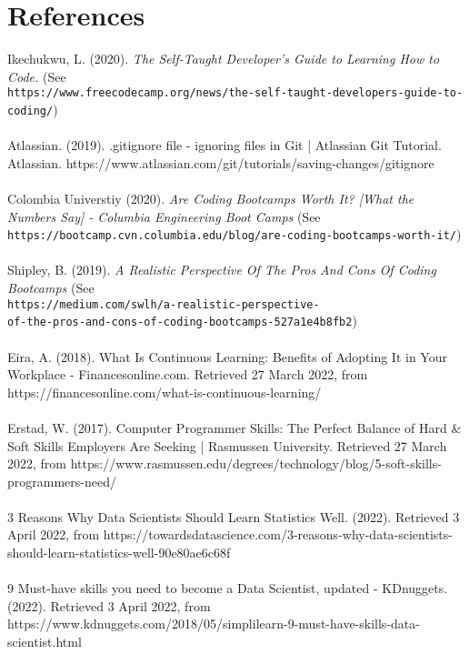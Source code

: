 \documentclass[a4paper, 11pt]{report}
\begin{document}
	\section{References}
	Ikechukwu, L. (2020). \textit{The Self-Taught Developer's Guide to Learning How to Code.} (See\\ \texttt{https://www.freecodecamp.org/news/the-self-taught-developers-guide-to-coding/})
	\\
	\\
	Atlassian. (2019). .gitignore file - ignoring files in Git | Atlassian Git Tutorial. Atlassian. https://www.atlassian.com/git/tutorials/saving-changes/gitignore
	\\
	\\
	Colombia Universtiy (2020). \textit{Are Coding Bootcamps Worth It? [What the Numbers Say] - Columbia Engineering Boot Camps} (See\\ \texttt{https://bootcamp.cvn.columbia.edu/blog/are-coding-bootcamps-worth-it/}) 
	\\
	\\
	Shipley, B. (2019). \textit{A Realistic Perspective Of The Pros And Cons Of Coding Bootcamps} (See\\ \texttt{https://medium.com/swlh/a-realistic-perspective-\\
		of-the-pros-and-cons-of-coding-bootcamps-527a1e4b8fb2}) 
	\\
	\\
	Eira, A. (2018). What Is Continuous Learning: Benefits of Adopting It in Your Workplace - Financesonline.com. Retrieved 27 March 2022, from https://financesonline.com/what-is-continuous-learning/
	\\
	\\
	Erstad, W. (2017). Computer Programmer Skills: The Perfect Balance of Hard \& Soft Skills Employers Are Seeking | Rasmussen University. Retrieved 27 March 2022, from https://www.rasmussen.edu/degrees/technology/blog/5-soft-skills-programmers-need/
	\\
	\\
	3 Reasons Why Data Scientists Should Learn Statistics Well. (2022). Retrieved 3 April 2022, from https://towardsdatascience.com/3-reasons-why-data-scientists-should-learn-statistics-well-90e80ae6c68f
	\\
	\\
	9 Must-have skills you need to become a Data Scientist, updated - KDnuggets. (2022). Retrieved 3 April 2022, from https://www.kdnuggets.com/2018/05/simplilearn-9-must-have-skills-data-scientist.html
	\\
\end{document}
